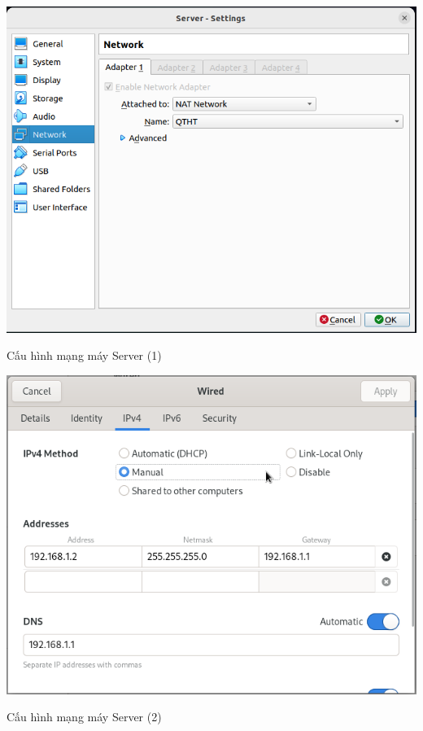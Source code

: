 \documentclass[a4paper, 11pt]{article}
\begin{document}
\begin{enumerate}
          \begin{minipage}
              {\linewidth}
              \captionsetup{type=figure}
              \centering
              \includegraphics[width=\linewidth]{images/server-network-1.png}
              \caption{Cấu hình mạng máy Server (1)}
              \label{figure:server-network-1}
          \end{minipage}

          \begin{minipage}
              {\linewidth}
              \captionsetup{type=figure}
              \centering
              \includegraphics[width=\linewidth]{images/server-network-2.png}
              \caption{Cấu hình mạng máy Server (2)}
              \label{figure:server-network-2}
          \end{minipage}


\end{enumerate}
\end{document}
